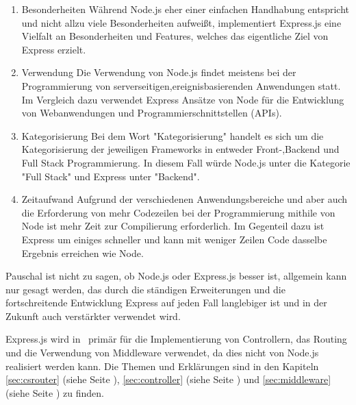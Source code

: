 \begin{enumerate}
    \item Besonderheiten
    \newline
    Während Node.js eher einer einfachen Handhabung entspricht und nicht allzu viele Besonderheiten aufweißt, implementiert Express.js eine Vielfalt an Besonderheiten und Features, welches das eigentliche Ziel von Express erzielt.\cite{NodeExp}
    \item Verwendung
    \newline
    Die Verwendung von Node.js findet meistens bei der Programmierung von serverseitigen,ereignisbasierenden Anwendungen statt. Im Vergleich dazu verwendet Express Ansätze von Node für die Entwicklung von Webanwendungen und Programmierschnittstellen (APIs).\cite{NodeExp}
    \item Kategorisierung
    \newline
    Bei dem Wort "Kategorisierung" handelt es sich um die Kategorisierung der jeweiligen Frameworks in entweder Front-,Backend und Full Stack Programmierung. In diesem Fall würde Node.js unter die Kategorie "Full Stack" und Express unter "Backend".\cite{NodeExp}
    \item Zeitaufwand
    \newline
    Aufgrund der verschiedenen Anwendungsbereiche und aber auch die Erforderung von mehr Codezeilen bei der Programmierung mithile von Node ist mehr Zeit zur Compilierung erforderlich. Im Gegenteil dazu ist Express um einiges schneller und kann mit weniger Zeilen Code dasselbe Ergebnis erreichen wie Node.\cite{NodeExp}
\end{enumerate} 

Pauschal ist nicht zu sagen, ob Node.js oder Express.js besser ist, allgemein kann nur gesagt werden, das durch die ständigen Erweiterungen und die fortschreitende Entwicklung Express auf jeden Fall langlebiger ist und in der Zukunft auch verstärkter verwendet wird. \cite{NodeExp}

Express.js wird in \ZELIA\ primär für die Implementierung von Controllern, das Routing und die Verwendung von Middleware verwendet, da dies nicht von Node.js realisiert werden kann. Die Themen und Erklärungen sind in den Kapiteln \ref{sec:csrouter} (siehe Seite \pageref{sec:csrouter}), \ref{sec:controller} (siehe Seite \pageref{sec:controller}) und \ref{sec:middleware} (siehe Seite \pageref{sec:middleware}) zu finden. \cite{NodeExp}

